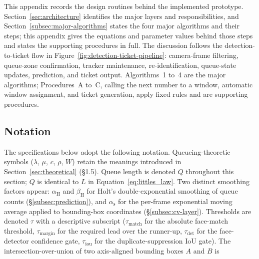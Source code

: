 

This appendix records the design routines behind the implemented
\sysname{} prototype. Section~\ref{sec:architecture} identifies the
major layers and responsibilities, and
Section~\ref{subsec:major-algorithms} states the four major
algorithms and their steps; this appendix gives the equations and
parameter values behind those steps and states the supporting
procedures in full. The discussion follows the detection-to-ticket flow in
Figure~\ref{fig:detection-ticket-pipeline}: camera-frame filtering,
queue-zone confirmation, tracker maintenance, re-identification,
queue-state updates, prediction, and ticket output. Algorithms~1 to~4
are the major algorithms; Procedures~A to~C, calling the next number to
a window, automatic window assignment, and ticket generation, apply
fixed rules and are supporting procedures.

\subsection{Notation}
\label{subsec:notation}

The specifications below adopt the following notation. Queueing-theoretic
symbols ($\lambda$, $\mu$, $c$, $\rho$, $W$) retain the meanings introduced
in Section~\ref{sec:theoretical} (\S1.5). Queue length is denoted $Q$
throughout this section; $Q$ is identical to $L$ in
Equation~\ref{eq:littles_law}. Two distinct smoothing factors appear:
$\alpha_{\mathrm{H}}$ and $\beta_{\mathrm{H}}$ for Holt's
double-exponential smoothing of queue counts (\S\ref{subsec:prediction}),
and $\alpha_{\mathrm{s}}$ for the per-frame exponential moving average
applied to bounding-box coordinates (\S\ref{subsec:cv-layer}).
Thresholds are denoted $\tau$ with a descriptive subscript
($\tau_{\mathrm{match}}$ for the absolute face-match threshold,
$\tau_{\mathrm{margin}}$ for the required lead over the runner-up,
$\tau_{\mathrm{det}}$ for the face-detector confidence gate,
$\tau_{\mathrm{iou}}$ for the duplicate-suppression IoU gate).
The intersection-over-union of two axis-aligned bounding boxes $A$ and
$B$ is


